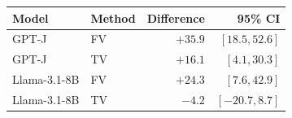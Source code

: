 \begin{tabular}{llrr}
\toprule
Model & Method & Difference & 95\% CI \\
\midrule
GPT-J & FV & $+35.9$ & $[18.5, 52.6]$ \\
GPT-J & TV & $+16.1$ & $[4.1, 30.3]$ \\
Llama-3.1-8B & FV & $+24.3$ & $[7.6, 42.9]$ \\
Llama-3.1-8B & TV & $-4.2$ & $[-20.7, 8.7]$ \\
\bottomrule
\end{tabular}

